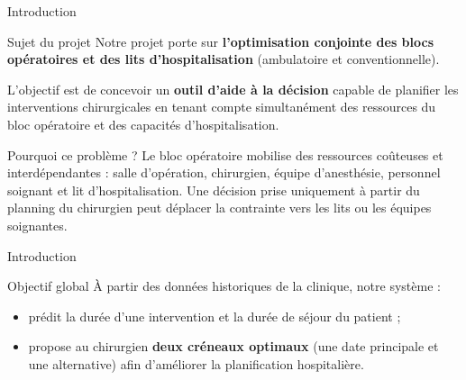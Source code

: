 \begin{frame}{Introduction}

  \begin{block}{Sujet du projet}
    Notre projet porte sur \textbf{l'optimisation conjointe des blocs opératoires et des lits d'hospitalisation} (ambulatoire et conventionnelle).

    L'objectif est de concevoir un \textbf{outil d'aide à la décision} capable de planifier les interventions chirurgicales en tenant compte simultanément des ressources du bloc opératoire et des capacités d'hospitalisation.
  \end{block}

  \vspace{0.3em}

  \begin{alertblock}{Pourquoi ce problème ?}
    Le bloc opératoire mobilise des ressources coûteuses et interdépendantes : salle d'opération, chirurgien, équipe d'anesthésie, personnel soignant et lit d'hospitalisation. Une décision prise uniquement à partir du planning du chirurgien peut déplacer la contrainte vers les lits ou les équipes soignantes.
  \end{alertblock}
\end{frame}
\begin{frame}{Introduction}
  \begin{block}{Objectif global}
    À partir des données historiques de la clinique, notre système :
    \begin{itemize}
      \item prédit la durée d'une intervention et la durée de séjour du patient ;
      \item propose au chirurgien \textbf{deux créneaux optimaux} (une date principale et une alternative) afin d'améliorer la planification hospitalière.
    \end{itemize}
  \end{block}
\end{frame}


